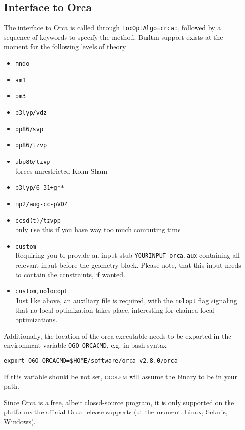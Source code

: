 \documentclass[a4paper,10pt]{scrbook}
\newcommand{\ogo}{\textsc{ogolem}}
\begin{document}
\subsection{Interface to Orca}
The interface to Orca is called through \texttt{LocOptAlgo=orca:}, followed by a
sequence of keywords to specify the method. Builtin support exists at the
moment for the following levels of theory
\begin{itemize}
  \item \texttt{mndo}
  \item \texttt{am1}
  \item \texttt{pm3}
  \item \texttt{b3lyp/vdz}
  \item \texttt{bp86/svp}
  \item \texttt{bp86/tzvp}
  \item \texttt{ubp86/tzvp}\\
	forces unrestricted Kohn-Sham
  \item \texttt{b3lyp/6-31+g**}
  \item \texttt{mp2/aug-cc-pVDZ}
  \item \texttt{ccsd(t)/tzvpp}\\
	only use this if you have way too much computing time
  \item \texttt{custom}\\
Requiring you to provide an input stub \texttt{YOURINPUT-orca.aux} containing
all relevant input before the geometry block. Please note, that this input needs
to contain the constraints, if wanted.
  \item \texttt{custom,nolocopt}\\
Just like above, an auxiliary file is required, with the \texttt{nolopt} flag
signaling that no local optimization takes place, interesting for
chained local optimizations.
\end{itemize}

Additionally, the location of the orca executable needs to be exported in the
environment variable \texttt{OGO\_ORCACMD}, e.g. in bash syntax
\begin{verbatim}
export OGO_ORCACMD=$HOME/software/orca_v2.8.0/orca
\end{verbatim}
If this variable should be not set, \ogo{} will assume the binary to be in
your path.

Since Orca is a free, albeit closed-source program, it is only supported on the
platforms the official Orca release supports (at the moment: Linux, Solaris,
Windows).
\end{document}
